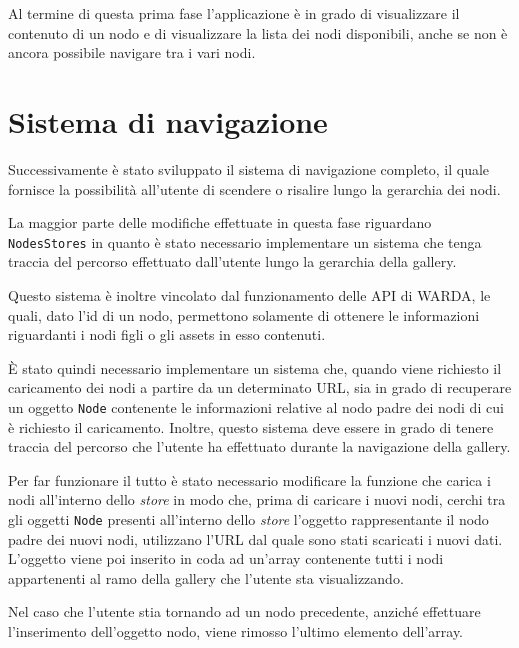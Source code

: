 Al termine di questa prima fase l'applicazione è in grado di visualizzare il contenuto di un nodo e di visualizzare la lista dei nodi disponibili, anche se non è ancora possibile navigare tra i vari nodi.

\section{Sistema di navigazione}

Successivamente è stato sviluppato il sistema di navigazione completo, il quale fornisce la possibilità all'utente di scendere o risalire lungo la gerarchia dei nodi.

La maggior parte delle modifiche effettuate in questa fase riguardano \texttt{NodesStores} in quanto è stato necessario implementare un sistema che tenga traccia del percorso effettuato dall'utente lungo la gerarchia della gallery.

Questo sistema è inoltre vincolato dal funzionamento delle API di WARDA, le quali, dato l'id di un nodo, permettono solamente di ottenere le informazioni riguardanti i nodi figli o gli assets in esso contenuti.

\`E stato quindi necessario implementare un sistema che, quando viene richiesto il caricamento dei nodi a partire da un determinato URL, sia in grado di recuperare un oggetto \texttt{Node} contenente le informazioni relative al nodo padre dei nodi di cui è richiesto il caricamento.
Inoltre, questo sistema deve essere in grado di tenere traccia del percorso che l'utente ha effettuato durante la navigazione della gallery.

Per far funzionare il tutto è stato necessario modificare la funzione che carica i nodi all'interno dello \textit{store} in modo che, prima di caricare i nuovi nodi, cerchi tra gli oggetti \texttt{Node} presenti all'interno dello \textit{store} l'oggetto rappresentante il nodo padre dei nuovi nodi, utilizzano l'URL dal quale sono stati scaricati i nuovi dati.
L'oggetto viene poi inserito in coda ad un'array contenente tutti i nodi appartenenti al ramo della gallery che l'utente sta visualizzando.

Nel caso che l'utente stia tornando ad un nodo precedente, anziché effettuare l'inserimento dell'oggetto nodo, viene rimosso l'ultimo elemento dell'array. 

